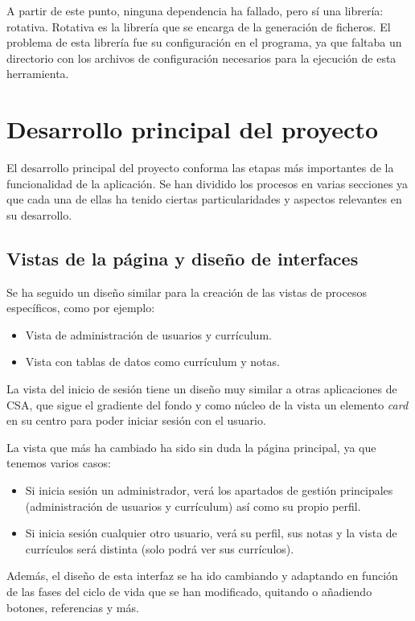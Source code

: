 A partir de este punto, ninguna dependencia ha fallado, pero sí una librería: rotativa.
Rotativa es la librería que se encarga de la generación de ficheros. El problema de esta librería fue su configuración en el programa, ya que faltaba un directorio con los archivos de configuración necesarios para la ejecución de esta herramienta.

\section{Desarrollo principal del proyecto}
El desarrollo principal del proyecto conforma las etapas más importantes de la funcionalidad de la aplicación. Se han dividido los procesos en varias secciones ya que cada una de ellas ha tenido ciertas particularidades y aspectos relevantes en su desarrollo.

\subsection{Vistas de la página y diseño de interfaces}
Se ha seguido un diseño similar para la creación de las vistas de procesos específicos, como por ejemplo:
\begin{itemize}
 \item Vista de administración de usuarios y currículum.
 \item Vista con tablas de datos como currículum y notas.
\end{itemize}

La vista del inicio de sesión tiene un diseño muy similar a otras aplicaciones de CSA, que sigue el gradiente del fondo y como núcleo de la vista un elemento \emph{card} en su centro para poder iniciar sesión con el usuario.

La vista que más ha cambiado ha sido sin duda la página principal, ya que tenemos varios casos:
\begin{itemize}
 \item Si inicia sesión un administrador, verá los apartados de gestión principales (administración de usuarios y currículum) así como su propio perfil.
 \item Si inicia sesión cualquier otro usuario, verá su perfil, sus notas y la vista de currículos será distinta (solo podrá ver sus currículos).
\end{itemize}

Además, el diseño de esta interfaz se ha ido cambiando y adaptando en función de las fases del ciclo de vida que se han modificado, quitando o añadiendo botones, referencias y más.

